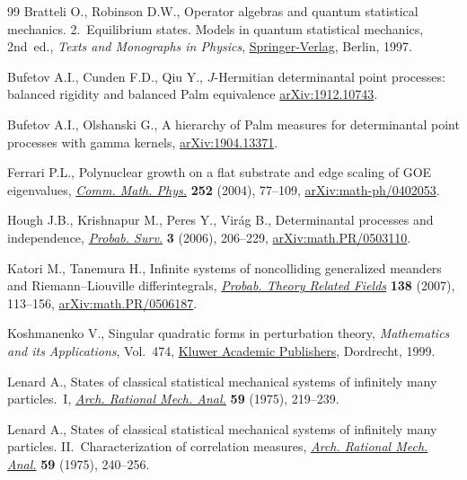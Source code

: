 \documentclass[11pt]{article}
\numberwithin{equation}{section}
\numberwithin{equation}{section}
\begin{document}
\begin{thebibliography}{99}
Bratteli O., Robinson D.W., Operator algebras and quantum statistical
 mechanics. 2.~Equilibrium states. Models in quantum statistical mechanics,
 2nd~ed., \textit{Texts and Monographs in Physics}, \href{https://doi.org/10.1007/978-3-662-03444-6}{Springer-Verlag}, Berlin, 1997.

Bufetov A.I., Cunden F.D., Qiu Y., {$J$}-{H}ermitian determinantal point
 processes: balanced rigidity and balanced {P}alm equivalence
 \href{https://arxiv.org/abs/1912.10743}{arXiv:1912.10743}.

Bufetov A.I., Olshanski G., A hierarchy of {P}alm measures for determinantal
 point processes with gamma kernels, \href{https://arxiv.org/abs/1904.13371}{arXiv:1904.13371}.

Ferrari P.L., Polynuclear growth on a flat substrate and edge scaling of {GOE}
 eigenvalues, \href{https://doi.org/10.1007/s00220-004-1204-6}{\textit{Comm. Math. Phys.}} \textbf{252} (2004), 77--109,
 \href{https://arxiv.org/abs/math-ph/0402053}{arXiv:math-ph/0402053}.

Hough J.B., Krishnapur M., Peres Y., Vir\'ag B., Determinantal processes and
 independence, \href{https://doi.org/10.1214/154957806000000078}{\textit{Probab. Surv.}} \textbf{3} (2006), 206--229,
 \href{https://arxiv.org/abs/math.PR/0503110}{arXiv:math.PR/0503110}.

Katori M., Tanemura H., Infinite systems of noncolliding generalized meanders
 and {R}iemann--{L}iouville differintegrals, \href{https://doi.org/10.1007/s00440-006-0015-4}{\textit{Probab. Theory Related
 Fields}} \textbf{138} (2007), 113--156, \href{https://arxiv.org/abs/math.PR/0506187}{arXiv:math.PR/0506187}.

Koshmanenko V., Singular quadratic forms in perturbation theory,
 \textit{Mathematics and its Applications}, Vol.~474, \href{https://doi.org/10.1007/978-94-011-4619-7}{Kluwer Academic
 Publishers}, Dordrecht, 1999.

Lenard A., States of classical statistical mechanical systems of infinitely
 many particles.~{I}, \href{https://doi.org/10.1007/BF00251601}{\textit{Arch. Rational Mech. Anal.}} \textbf{59} (1975),
 219--239.

Lenard A., States of classical statistical mechanical systems of infinitely
 many particles. {II}.~Characterization of correlation measures, \href{https://doi.org/10.1007/BF00251602}{\textit{Arch.
 Rational Mech. Anal.}} \textbf{59} (1975), 240--256.


\end{thebibliography}
\end{document}
